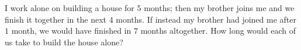 I work alone on building a house for $5$ months; then my brother joins me and we finish it together in the next $4$ months. If instead my brother had joined me after $1$ month, we would have finished in $7$ months altogether. How long would each of us take to build the house alone?
